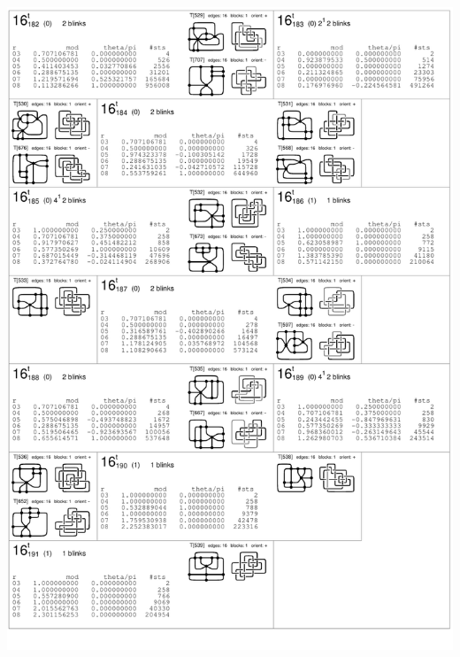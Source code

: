 \begin{center}
 \includegraphics[height=23.5cm]{E.figsbw2/con3catalog033_bw.pdf} \eject

\end{center}
